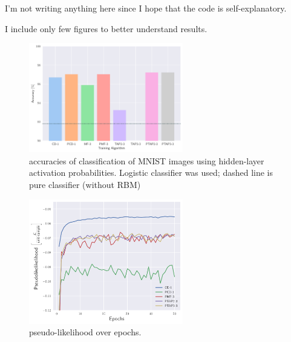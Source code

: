 I'm not writing anything here since I hope that the code is self-explanatory.

I include only few figures to better understand results.

\begin{figure}[h!]
  \centering
  \includegraphics[width=0.6\textwidth]{img/numerical-experiments/acc-hist.pdf}
  \caption{accuracies of classification of MNIST images using hidden-layer activation probabilities. Logistic classifier was used; dashed line is pure classifier (without RBM)}
\end{figure}
\begin{figure}[h!]
  \centering
  \includegraphics[width=0.6\textwidth]{img/numerical-experiments/psl-plot-global.pdf}
  \caption{pseudo-likelihood over epochs.}
\end{figure}